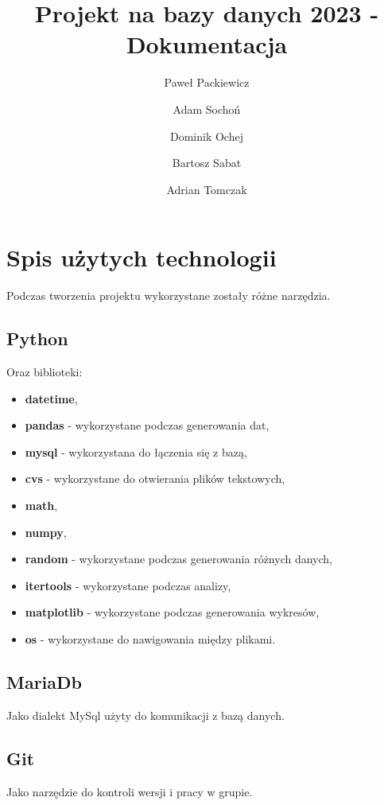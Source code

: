 \documentclass[12pt,a4paper]{article}
\begin{document}
\title{Projekt na bazy danych 2023 - Dokumentacja}
\author{Paweł Packiewicz \and Adam Sochoń \and Dominik Ochej \and Bartosz Sabat \and Adrian Tomczak}
\maketitle
\tableofcontents
\section{Spis użytych technologii}
Podczas tworzenia projektu wykorzystane zostały różne narzędzia.
\subsection{Python}
Oraz biblioteki:
\begin{itemize}
\item \textbf{datetime},
\item \textbf{pandas} - wykorzystane podczas generowania dat,
\item \textbf{mysql} - wykorzystana do łączenia się z bazą,
\item \textbf{cvs} - wykorzystane do otwierania plików tekstowych,
\item \textbf{math},
\item \textbf{numpy},
\item \textbf{random} - wykorzystane podczas generowania różnych danych,
\item \textbf{itertools} - wykorzystane podczas analizy,
\item \textbf{matplotlib} - wykorzystane podczas generowania wykresów,
\item \textbf{os} - wykorzystane do nawigowania między plikami.
\end{itemize}

\subsection{MariaDb}
Jako dialekt MySql użyty do komunikacji z bazą danych.

\subsection{Git}
Jako narzędzie do kontroli wersji i pracy w grupie.
\end{document}
